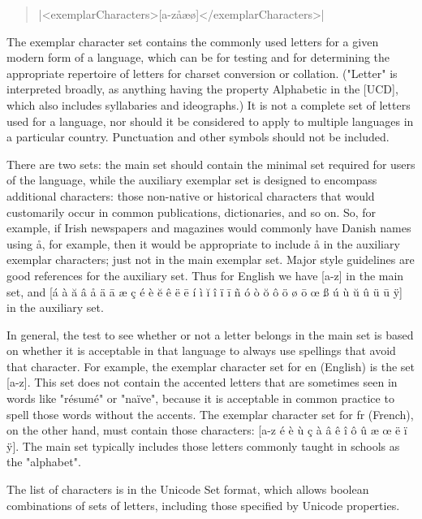 \begin{quote}
|<exemplarCharacters>[a-zåæø]</exemplarCharacters>|
\end{quote}

The exemplar character set contains the commonly used letters for a given modern form of a language, which can be for testing and for determining the appropriate repertoire of letters for charset conversion or collation. ("Letter" is interpreted broadly, as anything having the property Alphabetic in the [UCD], which also includes syllabaries and ideographs.) It is not a complete set of letters used for a language, nor should it be considered to apply to multiple languages in a particular country. Punctuation and other symbols should not be included.

There are two sets: the main set should contain the minimal set required for users of the language, while the auxiliary exemplar set is designed to encompass additional characters: those non-native or historical characters that would customarily occur in common publications, dictionaries, and so on. So, for example, if Irish newspapers and magazines would commonly have Danish names using å, for example, then it would be appropriate to include å in the auxiliary exemplar characters; just not in the main exemplar set. Major style guidelines are good references for the auxiliary set. Thus for English we have [a-z] in the main set, and [á à ă â å ä ā æ ç é è ĕ ê ë ē í ì ĭ î ï ī ñ ó ò ŏ ô ö ø ō œ ß ú ù ŭ û ü ū ÿ] in the auxiliary set.

In general, the test to see whether or not a letter belongs in the main set is based on whether it is acceptable in that language to always use spellings that avoid that character. For example, the exemplar character set for en (English) is the set [a-z]. This set does not contain the accented letters that are sometimes seen in words like "résumé" or "naïve", because it is acceptable in common practice to spell those words without the accents. The exemplar character set for fr (French), on the other hand, must contain those characters: [a-z é è ù ç à â ê î ô û æ œ ë ï ÿ]. The main set typically includes those letters commonly taught in schools as the "alphabet".

The list of characters is in the Unicode Set format, which allows boolean combinations of sets of letters, including those specified by Unicode properties.

